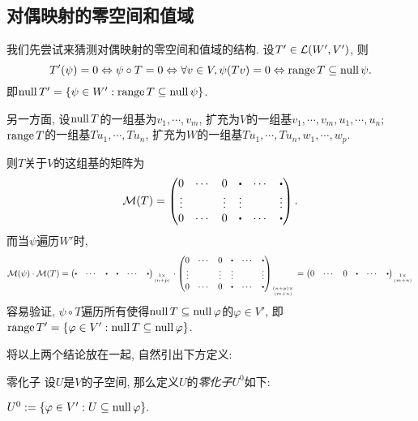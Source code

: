 \subsection{对偶映射的零空间和值域}

我们先尝试来猜测对偶映射的零空间和值域的结构. 设$T' \in \mathcal{L} (W',V')$, 则
$$T'(\psi) = 0 \Leftrightarrow \psi \circ T = 0 \Leftrightarrow \forall v \in V,\psi (Tv)= 0 \Leftrightarrow \operatorname{range} T \subseteq \operatorname{null} \psi .$$
即$\operatorname{null} T' = \{ \psi \in W' : \operatorname{range} T \subseteq \operatorname{null} \psi \}$. 

另一方面, 设$\operatorname{null} T$的一组基为$v_1,\cdots ,v_m$, 扩充为$V$的一组基$v_1,\cdots ,v_m,u_1,\cdots ,u_n$; $\operatorname{range} T$的一组基$Tu_1,\cdots ,Tu_n$, 扩充为$W$的一组基$Tu_1,\cdots ,Tu_n,w_1,\cdots ,w_p$. 

则$T$关于$V$的这组基的矩阵为$$\mathcal{M}(T) = \begin{pmatrix}
 0 & \cdots & 0 & \bigcdot & \cdots & \bigcdot \\
 \vdots &  & \vdots & \vdots &  & \vdots\\
 0 & \cdots & 0 & \bigcdot & \cdots & \bigcdot
\end{pmatrix}.$$
而当$\psi$遍历$W'$时, $$\mathcal{M}(\psi) \cdot \mathcal{M}(T) = \begin{pmatrix}
\bigcdot & \cdots & \bigcdot & \bigcdot & \cdots & \bigcdot
\end{pmatrix}_{1 \times \atop (n+p)} \cdot \begin{pmatrix}
 0 & \cdots & 0 & \bigcdot & \cdots & \bigcdot \\
 \vdots &  & \vdots & \vdots &  & \vdots\\
 0 & \cdots & 0 & \bigcdot & \cdots & \bigcdot
\end{pmatrix}_{(n+p) \times \atop (m+n)} = 
\begin{pmatrix}
0 & \cdots & 0 & \bigcdot & \cdots & \bigcdot
\end{pmatrix}_{1 \times \atop (m+n)}$$
容易验证, $\psi \circ T$遍历所有使得$\operatorname{null} T \subseteq \operatorname{null} \varphi$的$\varphi \in V'$, 即$\operatorname{range} T' = \{ \varphi \in V' : \operatorname{null} T \subseteq \operatorname{null} \varphi \}$. 

将以上两个结论放在一起, 自然引出下方定义: 

\begin{definition}{零化子}
	设$U$是$V$的子空间, 那么定义$U$的\textit{零化子}$U^0$如下: 
	\begin{center}
		$U^0 := \{ \varphi \in V':U \subseteq \operatorname{null} \varphi \}. $
	\end{center}
\end{definition}

